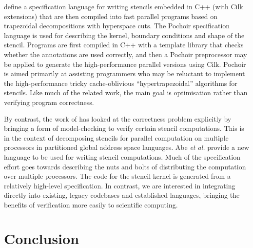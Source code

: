 \documentclass[10pt,preprint,numbers]{sigplanconf}
\theoremstyle{definition}
\begin{document}
\citet{Tang:2011:SPAA} define a specification language for writing
stencils embedded in C++ (with Cilk extensions) that are then compiled
into fast parallel programs based on trapezoidal decompositions with
hyperspace cuts. The Pochoir specification language is used for
describing the kernel, boundary conditions and shape of the
stencil. Programs are first compiled in C++ with a template library
that checks whether the annotations are used correctly, and then a
Pochoir preprocessor may be applied to generate the high-performance
parallel versions using Cilk.  Pochoir
is aimed primarily at assisting programmers who may be reluctant to
implement the high-performance tricky cache-oblivious
``hypertrapezoidal'' algorithms for stencils. 
Like much of the related work, the main goal 
is optimisation rather than verifying program correctness.

By contrast, the work of \citet{Abe:2013:IPDPSW} has looked at the
correctness problem explicitly by bringing a form of model-checking to
verify certain stencil computations. This is in the context of
decomposing stencils for parallel computation on multiple processors
 in partitioned global address
space languages. %
Abe \emph{et al.} provide a new language to
be used for writing stencil computations. Much of the specification
effort goes towards describing the nuts and bolts of distributing the
computation over multiple processors. The code for the stencil kernel
is generated from a relatively high-level specification. 
In contrast, we are interested in integrating directly
into existing, legacy codebases and established languages, bringing
the benefits of verification more easily to scientific computing.%


\section{Conclusion}\label{sec:conclusion}
\end{document}
